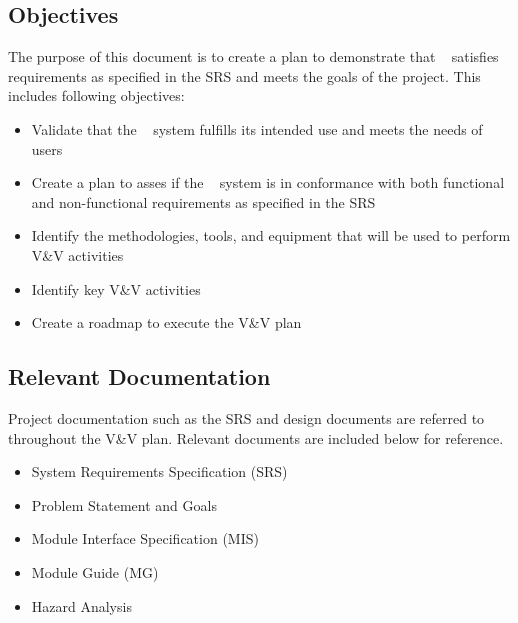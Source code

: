 \documentclass[12pt, titlepage]{article}
\begin{document}
\subsection{Objectives}

  
The purpose of this document is to create a plan to demonstrate that \progname~ satisfies requirements as specified in the SRS and meets the goals of the project. This includes following objectives:
  
\begin{itemize}
  \item Validate that the \progname~ system fulfills its intended use and meets the needs of users
  \item Create a plan to asses if the \progname~ system is in conformance with both functional and non-functional requirements as specified in the SRS
  \item Identify the methodologies, tools, and equipment that will be used to perform V\&V activities
  \item Identify key V\&V activities
  \item Create a roadmap to execute the V\&V plan
\end{itemize}

\subsection{Relevant Documentation}

  
Project documentation such as the SRS and design documents are referred to throughout the V\&V plan. Relevant documents are included below for reference.

\begin{itemize}
	\item System Requirements Specification (SRS) \cite{SRS}
	\item Problem Statement and Goals \cite{PSG}
	\item Module Interface Specification (MIS) \cite{MIS}
	\item Module Guide (MG) \cite{MG}
	\item Hazard Analysis \cite{FMEA}
\end{itemize}
\end{document}
